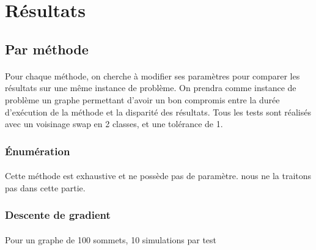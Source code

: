 \documentclass[12pt]{article}
\begin{document}
\section{Résultats}

\subsection{Par méthode}

\paragraph{}Pour chaque méthode, on cherche à modifier ses paramètres pour comparer les résultats sur une même instance de problème. On prendra comme instance de problème un graphe permettant d'avoir un bon compromis entre la durée d'exécution de la méthode et la disparité des résultats. Tous les tests sont réalisés avec un voisinage swap en 2 classes, et une tolérance de 1.

\subsubsection{Énumération}

\paragraph{}Cette méthode est exhaustive et ne possède pas de paramètre. nous ne la traitons pas dans cette partie.

\subsubsection{Descente de gradient}

\paragraph{}Pour un graphe de 100 sommets, 10 simulations par test
\end{document}
